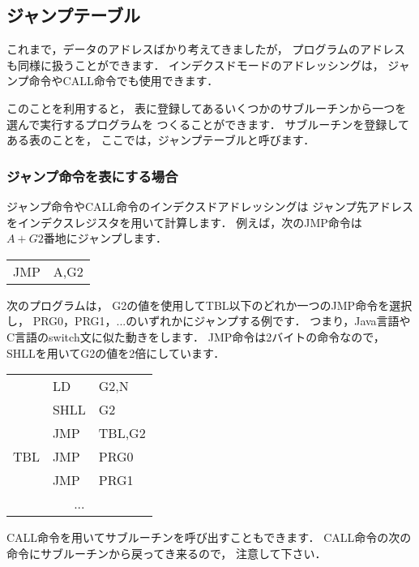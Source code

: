 \subsection{ジャンプテーブル}
\label{jmptbl}
これまで，データのアドレスばかり考えてきましたが，
プログラムのアドレスも同様に扱うことができます．
インデクスドモードのアドレッシングは，
ジャンプ命令やCALL命令でも使用できます．

このことを利用すると，
表に登録してあるいくつかのサブルーチンから一つを選んで実行するプログラムを
つくることができます．
サブルーチンを登録してある表のことを，
ここでは，ジャンプテーブルと呼びます．

\subsubsection{ジャンプ命令を表にする場合}
ジャンプ命令やCALL命令のインデクスドアドレッシングは
ジャンプ先アドレスをインデクスレジスタを用いて計算します．
例えば，次のJMP命令は$A+G2番地$にジャンプします．

{\small\tt\begin{center}
\begin{tabular}{l l}
JMP & A,G2   \\
\end{tabular}
\end{center}}

次のプログラムは，
G2の値を使用してTBL以下のどれか一つのJMP命令を選択し，
PRG0，PRG1，...のいずれかにジャンプする例です．
つまり，Java言語やC言語のswitch文に似た動きをします．
JMP命令は2バイトの命令なので，
SHLLを用いてG2の値を2倍にしています．

{\small\tt\begin{center}
\begin{tabular}{l l l}
    & LD    & G2,N   \\
    & SHLL  & G2     \\
    & JMP   & TBL,G2 \\
TBL & JMP   & PRG0   \\
    & JMP   & PRG1   \\
\multicolumn{3}{c}{...} \\
\end{tabular}
\end{center}}

CALL命令を用いてサブルーチンを呼び出すこともできます．
CALL命令の次の命令にサブルーチンから戻ってき来るので，
注意して下さい．

